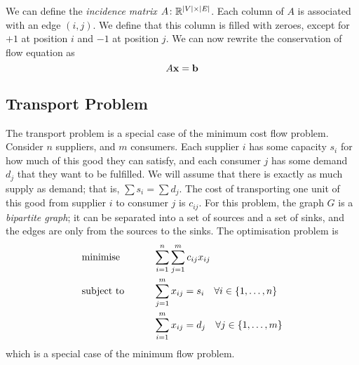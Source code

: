 \begin{definition}
	We can define the \textit{incidence matrix} \( A \colon \mathbb R^{\abs{V} \times \abs{E}} \).
	Each column of \( A \) is associated with an edge \( (i,j) \).
	We define that this column is filled with zeroes, except for \( +1 \) at position \( i \) and \( -1 \) at position \( j \).
	We can now rewrite the conservation of flow equation as
	\[
		A\vb x = \vb b
	\]
\end{definition}

\subsection{Transport Problem}
The transport problem is a special case of the minimum cost flow problem.
Consider \( n \) suppliers, and \( m \) consumers.
Each supplier \( i \) has some capacity \( s_i \) for how much of this good they can satisfy,
and each consumer \( j \) has some demand \( d_j \) that they want to be fulfilled.
We will assume that there is exactly as much supply as demand; that is, \( \sum s_i = \sum d_j \).
The cost of transporting one unit of this good from supplier \( i \) to consumer \( j \) is \( c_{ij} \).
For this problem, the graph \( G \) is a \textit{bipartite graph}; it can be separated into a set of sources and a set of sinks, and the edges are only from the sources to the sinks.
The optimisation problem is
\begin{alignat*}{2}
	 & \text{minimise}   & \qquad & \sum_{i = 1}^n \sum_{j = 1}^m c_{ij}x_{ij}                      \\
	 & \text{subject to} &        & \sum_{j = 1}^m x_{ij} = s_i \quad \forall i \in \qty{1,\dots,n} \\
	 &                   &        & \sum_{i = 1}^m x_{ij} = d_j \quad \forall j \in \qty{1,\dots,m} \\
\end{alignat*}
which is a special case of the minimum flow problem.

